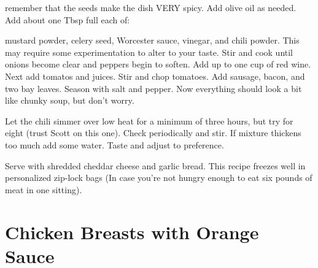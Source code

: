 remember that the seeds make the dish VERY spicy.  Add olive oil as needed. 
Add about one Tbsp full each of: 
\begin{figure}
\end{figure}
mustard powder, celery seed, Worcester
sauce, vinegar, and chili powder.  This may require some experimentation to
alter to your taste.  Stir and cook until onions become clear and peppers begin
to soften.  Add up to one cup of red wine.  Next add tomatos and juices.  Stir
and chop tomatoes.  Add sausage, bacon, and two bay leaves.  Season with salt
and pepper.  Now everything should look a bit like chunky soup, but don't
worry.

Let the chili simmer over low heat for a minimum of three hours, but try for
eight (trust Scott on this one). Check periodically and stir.  If mixture
thickens too much add some water.  Taste and adjust to preference.

Serve with shredded cheddar cheese and garlic bread.  This recipe freezes well
in personalized zip-lock bags (In case you're not hungry enough to eat 
six pounds of meat in one sitting).

\section{Chicken Breasts with Orange Sauce}

